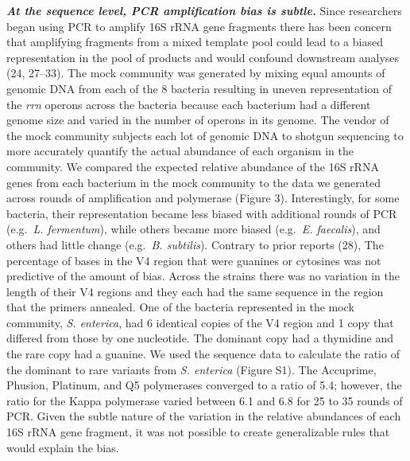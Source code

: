 \documentclass[11pt,]{article}
\begin{document}
\textbf{\emph{At the sequence level, PCR amplification bias is subtle.}}
Since researchers began using PCR to amplify 16S rRNA gene fragments
there has been concern that amplifying fragments from a mixed template
pool could lead to a biased representation in the pool of products and
would confound downstream analyses (24, 27--33). The mock community was
generated by mixing equal amounts of genomic DNA from each of the 8
bacteria resulting in uneven representation of the \emph{rrn} operons
across the bacteria because each bacterium had a different genome size
and varied in the number of operons in its genome. The vendor of the
mock community subjects each lot of genomic DNA to shotgun sequencing to
more accurately quantify the actual abundance of each organism in the
community. We compared the expected relative abundance of the 16S rRNA
genes from each bacterium in the mock community to the data we generated
across rounds of amplification and polymerase (Figure 3). Interestingly,
for some bacteria, their representation became less biased with
additional rounds of PCR (e.g.~\emph{L. fermentum}), while others became
more biased (e.g.~\emph{E. faecalis}), and others had little change
(e.g.~\emph{B. subtilis}). Contrary to prior reports (28), The
percentage of bases in the V4 region that were guanines or cytosines was
not predictive of the amount of bias. Across the strains there was no
variation in the length of their V4 regions and they each had the same
sequence in the region that the primers annealed. One of the bacteria
represented in the mock community, \emph{S. enterica}, had 6 identical
copies of the V4 region and 1 copy that differed from those by one
nucleotide. The dominant copy had a thymidine and the rare copy had a
guanine. We used the sequence data to calculate the ratio of the
dominant to rare variants from \emph{S. enterica} (Figure S1). The
Accuprime, Phusion, Platinum, and Q5 polymerases converged to a ratio of
5.4; however, the ratio for the Kappa polymerase varied between 6.1 and
6.8 for 25 to 35 rounds of PCR. Given the subtle nature of the variation
in the relative abundances of each 16S rRNA gene fragment, it was not
possible to create generalizable rules that would explain the bias.
\end{document}
